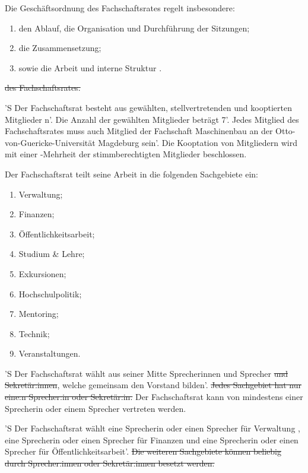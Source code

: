 \documentclass[%
	parskip=half,
]{scrartcl}
\newcommand{\edit}[1]{{\color{red} #1}}
\newcommand{\add}[1]{{\color{blue} #1}}
\newcommand{\delete}[1]{{\color{red} \sout{#1}}}
\begin{document}
\begin{contract}


Die Geschäftsordnung \add{des Fachschaftsrates} regelt insbesondere:
\begin{enumerate}[\qquad a)]
	\item den Ablauf, die Organisation und Durchführung der Sitzungen;
	\item die Zusammensetzung;
	\item \add{sowie die} Arbeit und interne Struktur\edit{.}
\end{enumerate}
\delete{des Fachschaftsrates.}


'S Der Fachschaftsrat besteht aus gewählten, stellvertretenden und kooptierten Mitglieder\add{n}'. Die Anzahl der
gewählten Mitglieder beträgt \edit{7}'. Jedes Mitglied des Fachschaftsrates muss auch Mitglied der Fachschaft
\add{Maschinenbau an der Otto-von-Guericke-Universität Magdeburg} sein'. Die Kooptation von Mitgliedern wird mit einer
-Mehrheit der stimmberechtigten Mitglieder beschlossen.

Der Fachschaftsrat teilt seine Arbeit in die folgenden Sachgebiete ein:
\begin{enumerate}[\qquad a)]
	\item Verwaltung;
	\item Finanzen;
	\item Öffentlichkeitsarbeit;
	\item Studium \& Lehre;
	\item Exkursionen;
	\item Hochschulpolitik;
	\item Mentoring;
	\item Technik;
	\item Veranstaltungen.
\end{enumerate}

\Clause{title={\edit{Vorstand}}}

'S Der Fachschaftsrat wählt aus seiner Mitte \edit{Sprecherinnen und Sprecher} \delete{und Sekretär:innen}, welche
\edit{gemeinsam den Vorstand bilden}'. \delete{Jedes Sachgebiet hat nur eine:n Sprecher:in oder Sekretär:in.}\add{Der
Fachschaftsrat kann von mindestens einer Sprecherin oder einem Sprecher vertreten werden.}

'S Der Fachschaftsrat wählt \edit{eine Sprecherin oder einen Sprecher} für Verwaltung\edit{, eine Sprecherin oder einen
Sprecher} für Finanzen \add{und eine Sprecherin oder einen Sprecher für Öffentlichkeitsarbeit}'. \delete{Die weiteren
Sachgebiete können beliebig durch Sprecher:innen oder Sekretär:innen besetzt werden.}


\end{contract}
\end{document}
